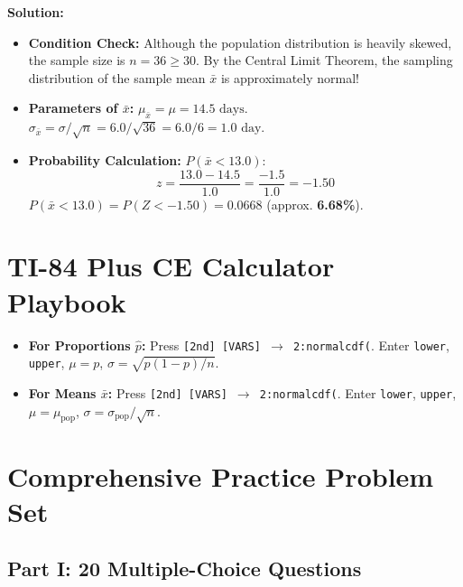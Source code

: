 \textbf{Solution:}
\begin{itemize}[leftmargin=1.2em]
  \item \textbf{Condition Check:} Although the population distribution is heavily skewed, the sample size is $n = 36 \ge 30$. By the Central Limit Theorem, the sampling distribution of the sample mean $\bar{x}$ is approximately normal!
  \item \textbf{Parameters of $\bar{x}$:}
  $\mu_{\bar{x}} = \mu = 14.5\text{ days}$.\\
  $\sigma_{\bar{x}} = \sigma / \sqrt{n} = 6.0 / \sqrt{36} = 6.0 / 6 = 1.0\text{ day}$.
  \item \textbf{Probability Calculation:} $P(\bar{x} < 13.0)$:
  \[ z = \frac{13.0 - 14.5}{1.0} = \frac{-1.5}{1.0} = -1.50 \]
  $P(\bar{x} < 13.0) = P(Z < -1.50) = \mathbf{0.0668}$ (approx. \textbf{6.68\%}).
\end{itemize}

\section{TI-84 Plus CE Calculator Playbook}

\begin{calculatorbox}
\begin{itemize}[leftmargin=1.2em]
  \item \textbf{For Proportions $\hat{p}$:} Press \texttt{[2nd] [VARS] $\rightarrow$ 2:normalcdf(}.
  Enter \texttt{lower}, \texttt{upper}, $\mu = p$, $\sigma = \sqrt{p(1-p)/n}$.
  \item \textbf{For Means $\bar{x}$:} Press \texttt{[2nd] [VARS] $\rightarrow$ 2:normalcdf(}.
  Enter \texttt{lower}, \texttt{upper}, $\mu = \mu_{\text{pop}}$, $\sigma = \sigma_{\text{pop}}/\sqrt{n}$.
\end{itemize}
\end{calculatorbox}

\section{Comprehensive Practice Problem Set}

\subsection*{Part I: 20 Multiple-Choice Questions}

